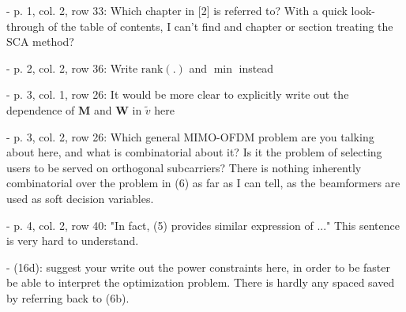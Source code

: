 \begin{enumerate}
\begin{enumerate}
\resp {}

 - {p. 1, col. 2, row 33: Which chapter in [2] is referred to? With a quick look-through of the table of contents, I can't find and chapter or section treating the SCA method?}

\resp {}

 - {p. 2, col. 2, row 36: Write $\text{rank}(.)$ and $\min$ instead}

\resp {}

 - {p. 3, col. 1, row 26: It would be more clear to explicitly write out the dependence of $\mathbf{M}$ and $\mathbf{W}$ in $\tilde{v}$ here}

\resp {}

 - {p. 3, col. 2, row 26: Which general MIMO-OFDM problem are you talking about here, and what is combinatorial about it? Is it the problem of selecting users to be served on orthogonal subcarriers? There is nothing inherently combinatorial over the problem in (6) as far as I can tell, as the beamformers are used as soft decision variables.}

\resp {}

 - {p. 4, col. 2, row 40: "In fact, (5) provides similar expression of ..." This sentence is very hard to understand.}

\resp {}

 - {(16d): suggest your write out the power constraints here, in order to be faster be able to interpret the optimization problem. There is hardly any spaced saved by referring back to (6b).}

\resp {}


\end{enumerate}
\end{enumerate}
